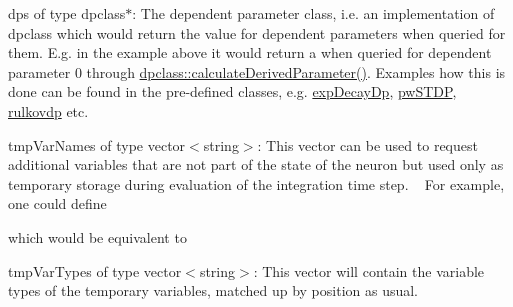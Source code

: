 \begin{DoxyItemize}
\item {\ttfamily dps} of type {\ttfamily dpclass}$\ast$\+: The dependent parameter class, i.\+e. an implementation of {\ttfamily dpclass} which would return the value for dependent parameters when queried for them. E.\+g. in the example above it would return {\ttfamily a} when queried for dependent parameter 0 through {\ttfamily \hyperlink{classdpclass_a4227f736c0ec826d7bda6c98e783d74a}{dpclass\+::calculate\+Derived\+Parameter()}}. Examples how this is done can be found in the pre-\/defined classes, e.\+g. \hyperlink{classexpDecayDp}{exp\+Decay\+Dp}, \hyperlink{classpwSTDP}{pw\+S\+T\+D\+P}, \hyperlink{classrulkovdp}{rulkovdp} etc.
\item {\ttfamily tmp\+Var\+Names} of type {\ttfamily vector$<$string$>$}\+: This vector can be used to request additional variables that are not part of the state of the neuron but used only as temporary storage during evaluation of the integration time step. ~\newline
 For example, one could define 
 which would be equivalent to 

\item {\ttfamily tmp\+Var\+Types} of type {\ttfamily vector$<$string$>$}\+: This vector will contain the variable types of the temporary variables, matched up by position as usual.
\end{DoxyItemize}

